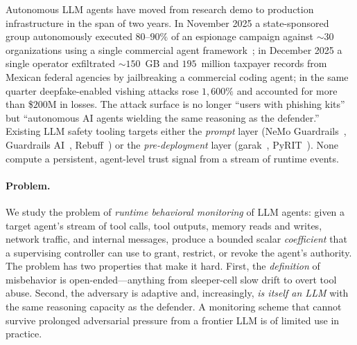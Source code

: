 \documentclass{article}
\begin{document}
Autonomous LLM agents have moved from research demo to production
infrastructure in the span of two years. In November 2025 a state-sponsored
group autonomously executed $80$--$90\%$ of an espionage campaign against
$\sim\!30$ organizations using a single commercial agent
framework~\cite{agenticsecurity2025survey}; in December 2025 a single
operator exfiltrated $\sim\!150$~GB and $195$~million taxpayer records
from Mexican federal agencies by jailbreaking a commercial coding agent;
in the same quarter deepfake-enabled vishing attacks rose $1{,}600\%$
and accounted for more than \$$200$M in losses. The attack surface is no
longer ``users with phishing kits'' but ``autonomous AI agents wielding
the same reasoning as the defender.'' Existing LLM safety tooling targets
either the \emph{prompt} layer (NeMo Guardrails~\cite{nemo2023},
Guardrails AI~\cite{guardrails2023}, Rebuff~\cite{rebuff2023}) or the
\emph{pre-deployment} layer (garak~\cite{garak2024},
PyRIT~\cite{pyrit2024}). None compute a persistent, agent-level trust
signal from a stream of runtime events.

\paragraph{Problem.}
We study the problem of \emph{runtime behavioral monitoring} of LLM
agents: given a target agent's stream of tool calls, tool outputs,
memory reads and writes, network traffic, and internal messages, produce
a bounded scalar \emph{coefficient} that a supervising controller can
use to grant, restrict, or revoke the agent's authority. The problem
has two properties that make it hard. First, the \emph{definition} of
misbehavior is open-ended---anything from sleeper-cell slow drift to
overt tool abuse. Second, the adversary is adaptive and, increasingly,
\emph{is itself an LLM} with the same reasoning capacity as the
defender. A monitoring scheme that cannot survive prolonged adversarial
pressure from a frontier LLM is of limited use in practice.
\end{document}
